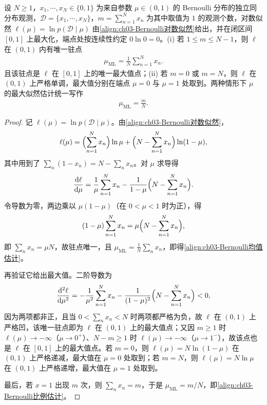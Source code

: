\documentclass[../../main.tex]{subfiles}
\begin{document}
\begin{proposition}\label{proposition:ch03-Bernoulli最大似然}
设 $N\geqslant1$，$x_1,\cdots,x_N\in\{0,1\}$ 为来自参数 $\mu\in(0,1)$ 的 Bernoulli 分布的独立同分布观测，$\mathcal{D}=\{x_1,\cdots,x_N\}$，$m=\sum_{n=1}^{N}x_n$ 为其中取值为 $1$ 的观测个数，对数似然 $\ell(\mu)=\ln p(\mathcal{D}\mid\mu)$ 由\eqref{align:ch03-Bernoulli对数似然}给出，并在闭区间 $[0,1]$ 上最大化，端点处按连续性约定 $0\ln0=0$。(i) 若 $1\leqslant m\leqslant N-1$，则 $\ell$ 在 $(0,1)$ 内有唯一驻点
\begin{align}
\mu_{\mathrm{ML}}=\frac{1}{N}\sum_{n=1}^{N}x_n.
\label{align:ch03-Bernoulli均值估计}
\end{align}
且该驻点是 $\ell$ 在 $[0,1]$ 上的唯一最大值点；(ii) 若 $m=0$ 或 $m=N$，则 $\ell$ 在 $(0,1)$ 上严格单调，最大值分别在端点 $\mu=0$ 与 $\mu=1$ 处取到。两种情形下 $\mu$ 的最大似然估计统一写作
\begin{align}
\mu_{\mathrm{ML}}=\frac{m}{N}.
\label{align:ch03-Bernoulli比例估计}
\end{align}
\end{proposition}
\begin{proof}
记 $\ell(\mu)=\ln p(\mathcal{D}\mid\mu)$。由\eqref{align:ch03-Bernoulli对数似然}，
\begin{align*}
\ell(\mu)=\Bigl(\sum_{n=1}^{N}x_n\Bigr)\ln\mu+\Bigl(N-\sum_{n=1}^{N}x_n\Bigr)\ln(1-\mu),
\end{align*}
其中用到了 $\sum_{n}(1-x_n)=N-\sum_{n}x_n$。对 $\mu$ 求导得
\begin{align*}
\frac{\mathrm{d}\ell}{\mathrm{d}\mu}=\frac{1}{\mu}\sum_{n=1}^{N}x_n-\frac{1}{1-\mu}\Bigl(N-\sum_{n=1}^{N}x_n\Bigr).
\end{align*}
令导数为零，两边乘以 $\mu(1-\mu)$（在 $0<\mu<1$ 时为正），得
\begin{align*}
(1-\mu)\sum_{n=1}^{N}x_n=\mu\Bigl(N-\sum_{n=1}^{N}x_n\Bigr),
\end{align*}
即 $\sum_{n}x_n=\mu N$，故驻点唯一，且 $\mu_{\mathrm{ML}}=\frac{1}{N}\sum_{n}x_n$，即得\eqref{align:ch03-Bernoulli均值估计}。

再验证它给出最大值。二阶导数为
\begin{align*}
\frac{\mathrm{d}^{2}\ell}{\mathrm{d}\mu^{2}}=-\frac{1}{\mu^{2}}\sum_{n=1}^{N}x_n-\frac{1}{(1-\mu)^{2}}\Bigl(N-\sum_{n=1}^{N}x_n\Bigr)<0,
\end{align*}
因为两项都非正，且当 $0<\sum_{n}x_n<N$ 时两项都严格为负，故 $\ell$ 在 $(0,1)$ 上严格凹，该唯一驻点即为 $\ell$ 在 $(0,1)$ 上的最大值点；又因 $m\geqslant1$ 时 $\ell(\mu)\to-\infty$（$\mu\to0^{+}$）、$N-m\geqslant1$ 时 $\ell(\mu)\to-\infty$（$\mu\to1^{-}$），故该点也是 $\ell$ 在 $[0,1]$ 上的最大值点。若 $m=0$，则 $\ell(\mu)=N\ln(1-\mu)$ 在 $(0,1)$ 上严格递减，最大值在 $\mu=0$ 处取到；若 $m=N$，则 $\ell(\mu)=N\ln\mu$ 在 $(0,1)$ 上严格递增，最大值在 $\mu=1$ 处取到。

最后，若 $x=1$ 出现 $m$ 次，则 $\sum_{n}x_n=m$，于是 $\mu_{\mathrm{ML}}=m/N$，即\eqref{align:ch03-Bernoulli比例估计}。
\end{proof}
\end{document}
